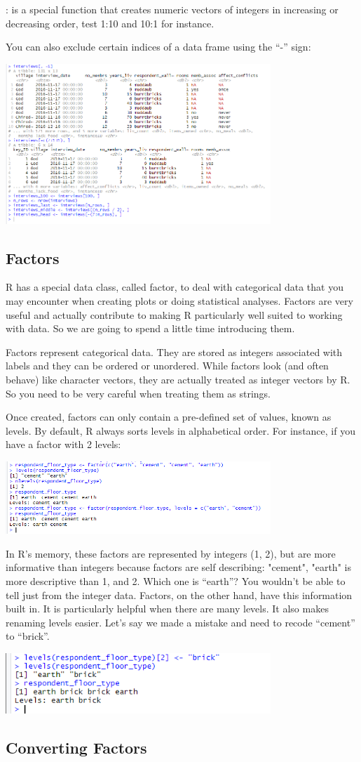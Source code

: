 \documentclass{article}
\begin{document}
: is a special function that creates numeric vectors of integers in increasing or decreasing order, test 1:10 and 10:1 for instance.

You can also exclude certain indices of a data frame using the “-” sign:    

\includegraphics[width=10cm]{RStudio023.PNG}

\subsection{Factors}

R has a special data class, called factor, to deal with categorical data that you may encounter when creating plots or doing statistical analyses. Factors are very useful and actually contribute to making R particularly well suited to working with data. So we are going to spend a little time introducing them.

Factors represent categorical data. They are stored as integers associated with labels and they can be ordered or unordered. While factors look (and often behave) like character vectors, they are actually treated as integer vectors by R. So you need to be very careful when treating them as strings.

Once created, factors can only contain a pre-defined set of values, known as levels. By default, R always sorts levels in alphabetical order. For instance, if you have a factor with 2 levels:

\includegraphics[width=10cm]{RStudio024.PNG}

In R’s memory, these factors are represented by integers (1, 2), but are more informative than integers because factors are self describing: "cement", "earth" is more descriptive than 1, and 2. Which one is “earth”? You wouldn’t be able to tell just from the integer data. Factors, on the other hand, have this information built in. It is particularly helpful when there are many levels. It also makes renaming levels easier. Let’s say we made a mistake and need to recode “cement” to “brick”.

\includegraphics[width=10cm]{RStudio025.PNG}

\subsection{Converting Factors}
\end{document}
